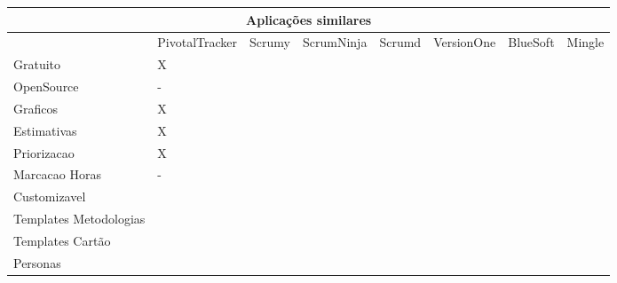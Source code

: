 \begin{sidewaystable}
	\begin{tabular}{|l|l|l|l|l|l|l|l}
		\hline
		\multicolumn{8}{|c|}{Aplicações similares} \\
		\hline
		 & PivotalTracker & Scrumy & ScrumNinja & Scrumd & VersionOne & BlueSoft & Mingle \\
		Gratuito & X & & & & & & \\
		OpenSource & - & & & & & & \\
		Graficos & X & & & & & & \\
		Estimativas & X & & & & & & \\
		Priorizacao & X & & & & & & \\
		Marcacao Horas & - & & & & & & \\
		Customizavel & & & & & & & \\
		Templates Metodologias & & & & & & & \\
		Templates Cartão & & & & & & & \\
		Personas & & & & & & & \\
		\hline
	\end{tabular}
\end{sidewaystable}



